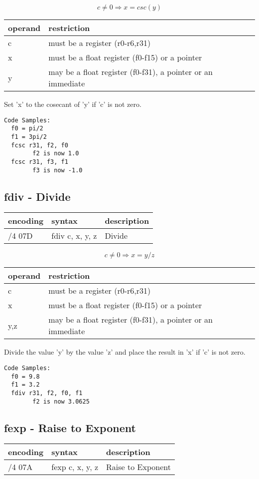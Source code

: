 \documentclass[letterpaper,10pt,openright,twoside,onecolumn]{book}
\begin{document}
  \begin{displaymath} c \neq 0 \Rightarrow x = csc(y)\end{displaymath}

  \flushleft
  \begin{tabular}{|l|l|}
   \hline
    operand & restriction \\
   \hline
    c & must be a register (r0-r6,r31) \\
    x & must be a float register (f0-f15) or a pointer \\
    y & may be a float register (f0-f31), a pointer or an immediate \\
   \hline
  \end{tabular}

  Set 'x' to the cosecant of 'y' if 'c' is not zero.

  \begin{verbatim}
Code Samples:
  f0 = pi/2
  f1 = 3pi/2
  fcsc r31, f2, f0
        f2 is now 1.0
  fcsc r31, f3, f1
        f3 is now -1.0
  \end{verbatim}
\newpage\subsection{fdiv - Divide}
  \begin{tabular}{|l|l|l|}
   \hline
    encoding & syntax & description \\
   \hline
    /4 07D & fdiv c, x, y, z & Divide \\
   \hline
  \end{tabular}

  \begin{displaymath} c \neq 0 \Rightarrow x = y / z\end{displaymath}

  \flushleft
  \begin{tabular}{|l|l|}
   \hline
    operand & restriction \\
   \hline
    c & must be a register (r0-r6,r31) \\
    x & must be a float register (f0-f15) or a pointer \\
    y,z & may be a float register (f0-f31), a pointer or an immediate \\
   \hline
  \end{tabular}

  Divide the value 'y' by the value 'z' and place the result in 'x' if 'c' is not zero.

  \begin{verbatim}
Code Samples:
  f0 = 9.8
  f1 = 3.2
  fdiv r31, f2, f0, f1
        f2 is now 3.0625
  \end{verbatim}
\newpage\subsection{fexp - Raise to Exponent}
  \begin{tabular}{|l|l|l|}
   \hline
    encoding & syntax & description \\
   \hline
    /4 07A & fexp c, x, y, z & Raise to Exponent \\
   \hline
  \end{tabular}
\end{document}
